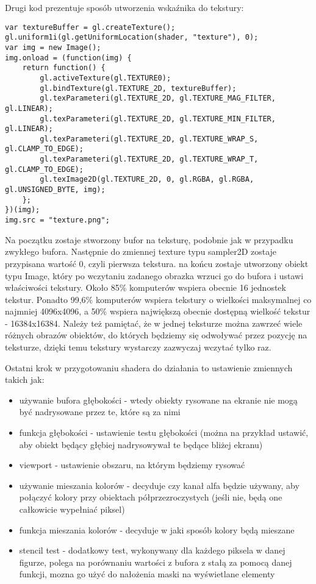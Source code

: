 \noindent Drugi kod prezentuje sposób utworzenia wskaźnika do tekstury:
\begin{lstlisting}
var textureBuffer = gl.createTexture();
gl.uniform1i(gl.getUniformLocation(shader, "texture"), 0);
var img = new Image();
img.onload = (function(img) {
	return function() {
		gl.activeTexture(gl.TEXTURE0);
		gl.bindTexture(gl.TEXTURE_2D, textureBuffer);
		gl.texParameteri(gl.TEXTURE_2D, gl.TEXTURE_MAG_FILTER, gl.LINEAR);
		gl.texParameteri(gl.TEXTURE_2D, gl.TEXTURE_MIN_FILTER, gl.LINEAR);
		gl.texParameteri(gl.TEXTURE_2D, gl.TEXTURE_WRAP_S, gl.CLAMP_TO_EDGE);
		gl.texParameteri(gl.TEXTURE_2D, gl.TEXTURE_WRAP_T, gl.CLAMP_TO_EDGE);
		gl.texImage2D(gl.TEXTURE_2D, 0, gl.RGBA, gl.RGBA, gl.UNSIGNED_BYTE, img);
	};
})(img);
img.src = "texture.png";
\end{lstlisting}

Na początku zostaje stworzony bufor na teksturę, podobnie jak w przypadku zwykłego bufora. Następnie do zmiennej texture typu sampler2D zostaje przypisana warto\'sć 0, czyli pierwsza tekstura. na końcu zostaje utworzony obiekt typu Image, który po wczytaniu zadanego obrazka wrzuci go do bufora i ustawi wła\'sciwo\'sci tekstury. Około 85\% komputerów wspiera obecnie 16 jednostek tekstur. Ponadto 99,6\% komputerów wspiera tekstury o wielko\'sci maksymalnej co najmniej 4096x4096, a 50\% wspiera największą obecnie dostępną wielko\'sć tekstur - 16384x16384. Należy też pamiętać, że w jednej teksturze można zawrzeć wiele różnych obrazów obiektów, do których będziemy się odwoływać przez pozycję na teksturze, dzięki temu tekstury wystarczy zazwyczaj wczytać tylko raz.

Ostatni krok w przygotowaniu shadera do działania to ustawienie zmiennych takich jak:\begin{itemize}[topsep=0.2em, itemsep=0.5em, partopsep=0em, parsep=0em]
	\item używanie bufora głęboko\'sci - wtedy obiekty rysowane na ekranie nie mogą być nadrysowane przez te, które są za nimi
	\item funkcja głęboko\'sci - ustawienie testu głęboko\'sci (można na przykład ustawić, aby obiekt będący głębiej nadrysowywał te będące bliżej ekranu)
	\item viewport - ustawienie obszaru, na którym będziemy rysować
	\item używanie mieszania kolorów - decyduje czy kanał alfa będzie używany, aby połączyć kolory przy obiektach półprzezroczystych (je\'sli nie, będą one całkowicie wypełniać piksel)
	\item funkcja mieszania kolorów - decyduje w jaki sposób kolory będą mieszane
	\item stencil test - dodatkowy test, wykonywany dla każdego piksela w danej figurze, polega na porównaniu warto\'sci z bufora z stałą za pomocą danej funkcji, mozna go użyć do nałożenia maski na wy\'swietlane elementy
\end{itemize}


